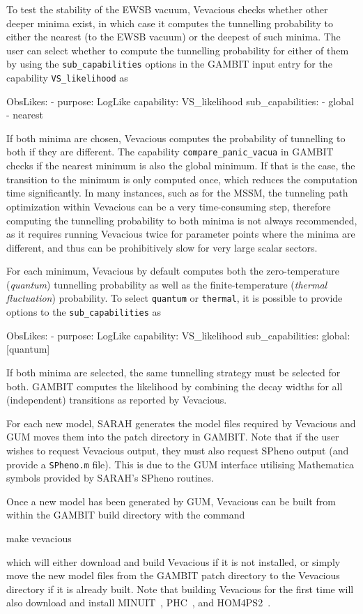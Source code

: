 \documentclass[pdftex,twocolumn,epjc3_preprint,runningheads]{svjour3}
\renewcommand{\_}{\discretionary{\underscore}{}{\underscore}}
\newcommand\cpp[1]{{\lstinline!#1!}}  %
\newcommand\yaml[1]{{\lstset{style=yaml}\lstinline!#1!\lstset{style=cpp}}}
\newcommand\term[1]{{\lstset{style=terminal}\lstinline!#1!\lstset{style=cpp}}}
\newcommand{\gambit}{\textsf{GAMBIT}\xspace}
\newcommand{\GB}{\gambit}
\newcommand\Mathematica{\textsf{Mathematica}\xspace}
\newcommand{\gum}{\textsf{GUM}\xspace}
\newcommand{\sarah}{\textsf{SARAH}\xspace}
\newcommand{\veva}{\textsf{Vevacious}\xspace}
\newcommand{\spheno}{\textsf{SPheno}\xspace}
\begin{document}
To test the stability of the EWSB vacuum, Vevacious checks whether other deeper minima exist, in which case it computes the tunnelling probability to either the nearest (to the EWSB vacuum) or the deepest of such minima. The user can select whether to compute the tunnelling probability for either of them by using the \yaml{sub_capabilities} options in the \gambit input entry for the capability \cpp{VS_likelihood} as
%
\begin{lstyaml}
ObsLikes:
  - purpose:      LogLike
    capability:   VS_likelihood
    sub_capabilities:
      - global
      - nearest
\end{lstyaml}
%
If both minima are chosen, \veva computes the probability of tunnelling to both if they are different. The capability \cpp{compare_panic_vacua} in \GB checks if the nearest minimum is also the global minimum. If that is the case, the transition to the minimum is only computed once, which reduces the computation time significantly.
In many instances, such as for the MSSM, the tunneling path optimization within \veva can be a very time-consuming step, therefore computing the tunnelling probability to both minima is not always recommended, as it requires running \veva twice for parameter points where the minima are different, and thus can be prohibitively slow for very large scalar sectors.

For each minimum, \veva by default computes both the zero-temperature (\textit{quantum}) tunnelling probability as well as the finite-temperature (\textit{thermal fluctuation}) probability. To select \yaml{quantum} or \yaml{thermal}, it is possible to provide options to the \yaml{sub_capabilities} as
%
\begin{lstyaml}
ObsLikes:
  - purpose:      LogLike
    capability:   VS_likelihood
    sub_capabilities:
      global: [quantum]
\end{lstyaml}
%
If both minima are selected, the same tunnelling strategy must be selected for both. \GB computes the likelihood by combining the decay widths for all (independent) transitions as reported by \veva.

For each new model, \sarah generates the model files required by \veva and \gum moves them into the patch directory in \GB. Note that if the user wishes to request \veva output, they must also request \spheno output (and provide a \term{SPheno.m} file). This is due to the \gum interface utilising \Mathematica symbols provided by \sarah's \spheno routines.

Once a new model has been generated by \gum, \veva can be built from within the \gambit build directory with the command
%
\begin{lstterm}
make vevacious
\end{lstterm}
%
which will either download and build \veva if it is not installed, or simply move the new model files from the \GB patch directory to the \veva directory if it is already built. Note that building \veva for the first time will also download and install \textsf{MINUIT}~\cite{James:1975dr}, \textsf{PHC}~\cite{Verschelde2011}, and \textsf{HOM4PS2}~\cite{Lee2008}.
\end{document}
